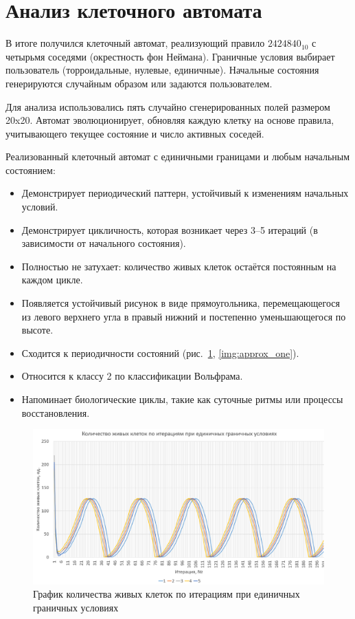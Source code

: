 \documentclass[a4paper, final]{article}
\begin{document}
\newpage
\section{Анализ клеточного автомата}
В  итоге получился клеточный автомат, реализующий правило $2424840_{10}$ с четырьмя соседями (окрестность фон Неймана). 
Граничные условия выбирает пользователь (торроидальные, нулевые, единичные). Начальные состояния генерируются 
случайным образом или задаются пользователем. 

Для анализа использовались пять случайно сгенерированных полей размером 20x20.
Автомат эволюционирует, обновляя каждую клетку на основе правила, учитывающего текущее состояние и число 
активных соседей.

Реализованный клеточный автомат с единичными границами и любым начальным состоянием:
\begin{itemize}
  \item Демонстрирует периодический паттерн, устойчивый к изменениям начальных условий.
  \item Демонстрирует цикличность, которая возникает через 3–5 итераций (в зависимости от начального состояния).
  \item Полностью не затухает: количество живых клеток остаётся постоянным на каждом цикле.
  \item Появляется устойчивый рисунок в виде прямоугольника, перемещающегося из левого верхнего угла в правый нижний
  и постепенно уменьшающегося по высоте.
  \item Сходится к периодичности состояний (рис.~\ref{img:graph_one}, \ref{img:approx_one}).
  \item Относится к классу 2 по классификации Вольфрама.
  \item Напоминает биологические циклы, такие как суточные ритмы или процессы восстановления.
\end{itemize}

\begin{figure}[h!]
   \centering
   \includegraphics[width=0.8\linewidth]{graph_one.png}
   \caption{График количества живых клеток по итерациям при единичных граничных условиях}
   \label{img:graph_one}
\end{figure}
\end{document}
